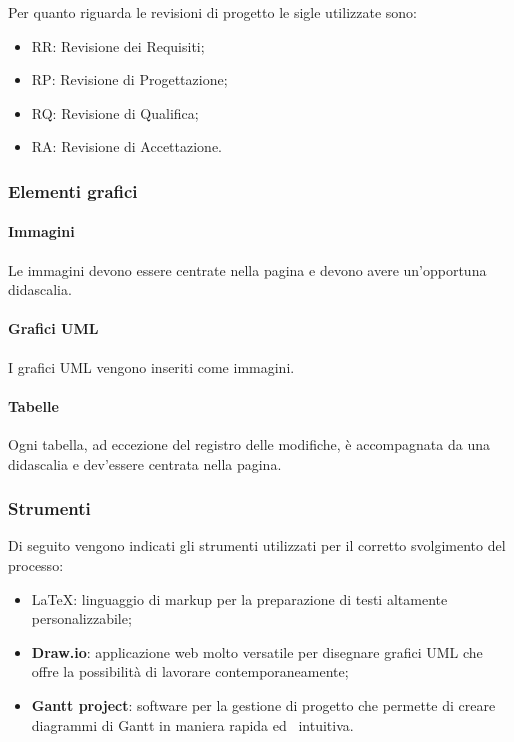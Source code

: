Per quanto riguarda le revisioni di progetto le sigle utilizzate sono:
\begin{itemize}
    \item RR: Revisione dei Requisiti;
    \item RP: Revisione di Progettazione;
    \item RQ: Revisione di Qualifica;
    \item RA: Revisione di Accettazione.
\end{itemize}

\subsubsection{Elementi grafici}
\label{ssub:elementi_grafici}

\paragraph{Immagini}
\label{par:immagini}

Le immagini devono essere centrate nella pagina e devono avere un'opportuna didascalia.

\paragraph{Grafici UML}
\label{par:uml}

I grafici UML vengono inseriti come immagini.

\paragraph{Tabelle}
\label{par:tabelle}

Ogni tabella, ad eccezione del registro delle modifiche, è accompagnata da una didascalia e dev'essere centrata nella
pagina.

\subsubsection{Strumenti}
\label{ssub:strumenti}

Di seguito vengono indicati gli strumenti utilizzati per il corretto svolgimento del processo:
\begin{itemize}
	\item \LaTeX: linguaggio di markup per la preparazione di testi altamente personalizzabile;
	\item \textbf{Draw.io}: applicazione web molto versatile per disegnare grafici UML che offre la possibilità di lavorare
		contemporaneamente;
	\item \textbf{Gantt project}: software per la gestione di progetto che permette di creare diagrammi di Gantt in maniera rapida ed \
		intuitiva.
\end{itemize}

